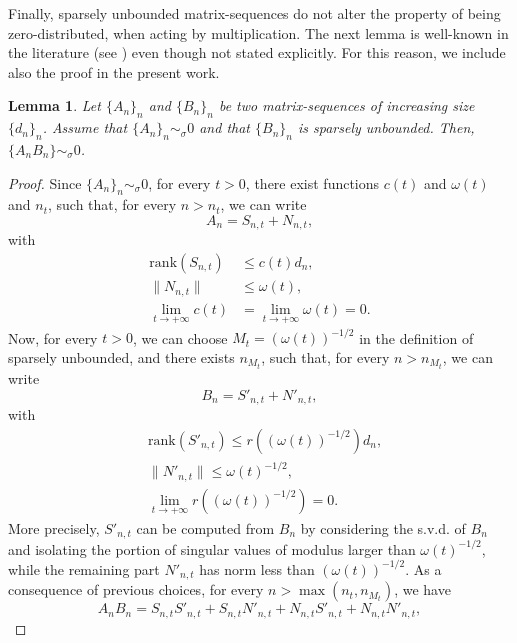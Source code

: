 \documentclass{amsart}
\newtheorem{lem}[thm]{Lemma}
\begin{document}
Finally, sparsely unbounded matrix-sequences do not alter the property of being zero-distributed, when acting by multiplication. The next lemma is well-known in the literature (see \cite{glt-book-1,glt-book-2}) even though not stated explicitly. For this reason, we include also the proof in the present work.
\begin{lem}\label{preserving_zero_distribution}
    Let $\{A_n\}_n$ and $\{B_n\}_n$ be two matrix-sequences of increasing size $\{d_n\}_n$. Assume that $\{A_n\}_n\sim_\sigma 0$ and that $\{B_n\}_n$ is sparsely unbounded. Then, $\{A_nB_n\}\sim_\sigma 0$.
\end{lem}
\begin{proof}
    Since $\{A_n\}_n\sim_\sigma 0$, for every $t>0$, there exist functions $c(t)$ and $\omega(t)$ and $n_t$, such that, for every $n>n_t$, we can write
   \begin{equation*} 
A_n = S_{n,t} + N_{n,t},
    \end{equation*}
    with 
    \begin{align*}
        \mathrm{rank}(S_{n,t})&\leq c(t)d_n,\\
        \|N_{n,t}\|&\leq \omega(t),\\
        \lim\limits_{t\to+\infty}c(t)&=\lim\limits_{t\to+\infty}\omega(t)=0.
    \end{align*}
    Now, for every $t>0$, we can choose $M_t=(\omega(t))^{-1/2}$ in the definition of sparsely unbounded, and there exists $n_{M_t}$, such that, for every $n>n_{M_t}$, we can write
    \begin{equation*}
        B_n=S'_{n,t}+N'_{n,t},
    \end{equation*}
    with
    \begin{align*}
        &\mathrm{rank}(S'_{n,t})\leq r((\omega(t))^{-1/2})d_n,\\
        &\|N'_{n,t}\|\leq \omega(t)^{-1/2},\\
        &\lim\limits_{t\to+\infty}r((\omega(t))^{-1/2})=0.
    \end{align*}
    More precisely, $S'_{n,t}$ can be computed from $B_n$ by considering the s.v.d. of $B_n$ and isolating the portion of singular values of modulus larger than $\omega(t)^{-1/2}$, while the remaining part $N'_{n,t}$ has norm less than $(\omega(t))^{-1/2}$. 
    As a consequence of previous choices, for every $n>\max(n_t,n_{M_t})$, we have
    \begin{equation*}
        A_nB_n=S_{n,t}S'_{n,t}+S_{n,t}N'_{n,t} + N_{n,t}S'_{n,t}+N_{n,t}N'_{n,t},
    \end{equation*}

\end{proof}
\end{document}

